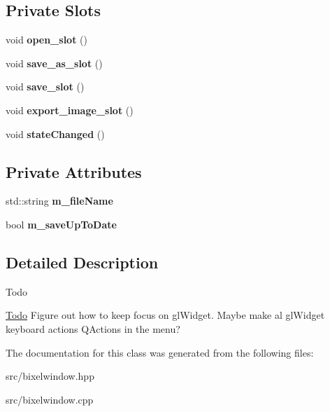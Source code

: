 \subsection*{Private Slots}
\begin{DoxyCompactItemize}
\item 
\hypertarget{classBixelWindow_ae423d61797dcb1728aecc79fdf071f62}{void {\bfseries open\-\_\-slot} ()}\label{classBixelWindow_ae423d61797dcb1728aecc79fdf071f62}

\item 
\hypertarget{classBixelWindow_a70883576a0a181856f313df7754e514e}{void {\bfseries save\-\_\-as\-\_\-slot} ()}\label{classBixelWindow_a70883576a0a181856f313df7754e514e}

\item 
\hypertarget{classBixelWindow_aad55b56dde73817c87eba8eb2d3404ed}{void {\bfseries save\-\_\-slot} ()}\label{classBixelWindow_aad55b56dde73817c87eba8eb2d3404ed}

\item 
\hypertarget{classBixelWindow_ab2213a43259661c1246c0b533da9a595}{void {\bfseries export\-\_\-image\-\_\-slot} ()}\label{classBixelWindow_ab2213a43259661c1246c0b533da9a595}

\item 
\hypertarget{classBixelWindow_a496f56dc0cc83b36263d67c827fa040e}{void {\bfseries state\-Changed} ()}\label{classBixelWindow_a496f56dc0cc83b36263d67c827fa040e}

\end{DoxyCompactItemize}
\subsection*{Private Attributes}
\begin{DoxyCompactItemize}
\item 
\hypertarget{classBixelWindow_a79a31382419d315ab1dfb86d421afd78}{std\-::string {\bfseries m\-\_\-file\-Name}}\label{classBixelWindow_a79a31382419d315ab1dfb86d421afd78}

\item 
\hypertarget{classBixelWindow_aa8803890cb2c415870bd3d74834a266d}{bool {\bfseries m\-\_\-save\-Up\-To\-Date}}\label{classBixelWindow_aa8803890cb2c415870bd3d74834a266d}

\end{DoxyCompactItemize}


\subsection{Detailed Description}
\begin{DoxyRefDesc}{Todo}
\item[\hyperlink{todo__todo000007}{Todo}]Figure out how to keep focus on gl\-Widget. Maybe make al gl\-Widget keyboard actions Q\-Actions in the menu? \end{DoxyRefDesc}


The documentation for this class was generated from the following files\-:\begin{DoxyCompactItemize}
\item 
src/bixelwindow.\-hpp\item 
src/bixelwindow.\-cpp\end{DoxyCompactItemize}
